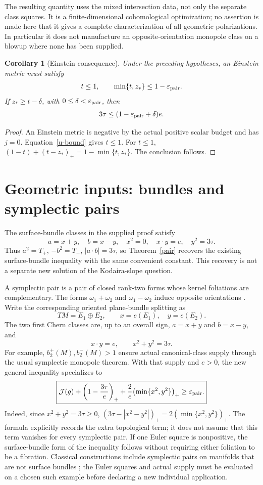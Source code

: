 \documentclass[11pt,a4paper]{article}
\newtheorem{corollary}[theorem]{Corollary}
\theoremstyle{definition}\newtheorem{assumption}[theorem]{Input}
\theoremstyle{remark}\newtheorem{remark}[theorem]{Remark}
\newcommand{\cJ}{\mathcal J}
\numberwithin{equation}{section}
\begin{document}
The resulting quantity uses the mixed intersection data, not only the separate class squares. It is a finite-dimensional cohomological optimization; no assertion is made here that it gives a complete characterization of all geometric polarizations. In particular it does not manufacture an opposite-orientation monopole class on a blowup where none has been supplied.

\begin{corollary}[Einstein consequence]
Under the preceding hypotheses, an Einstein metric must satisfy
\[
 t\le1,\qquad \min\{t,z_*\}\le1-\varepsilon_{\rm pair}.
\]
If $z_*\ge t-\delta$, with $0\le\delta<\varepsilon_{\rm pair}$, then
\[
 3\tau\le(1-\varepsilon_{\rm pair}+\delta)e.
\]
\end{corollary}
\begin{proof}
An Einstein metric is negative by the actual positive scalar budget and has $j=0$. Equation~\eqref{u-bound} gives $t\le1$. For $t\le1$,
$(1-t)+(t-z_*)_+=1-\min\{t,z_*\}$. The conclusion follows.
\end{proof}

\section{Geometric inputs: bundles and symplectic pairs}
The surface-bundle classes in the supplied proof satisfy
\[
 a=x+y,\quad b=x-y,\quad x^2=0,\quad x\cdot y=e,\quad y^2=3\tau.
\]
Thus $a^2=T_+$, $-b^2=T_-$, $|a\cdot b|=3\tau$, so Theorem~\ref{pair} recovers the existing surface-bundle inequality with the same convenient constant. This recovery is not a separate new solution of the Kodaira-slope question.

A symplectic pair is a pair of closed rank-two forms whose kernel foliations are complementary. The forms $\omega_1+\omega_2$ and $\omega_1-\omega_2$ induce opposite orientations \cite{BandeK}. Write the corresponding oriented plane-bundle splitting as
\[
 TM=E_1\oplus E_2,\qquad x=e(E_1),\quad y=e(E_2).
\]
The two first Chern classes are, up to an overall sign, $a=x+y$ and $b=x-y$, and
\[
 x\cdot y=e,\qquad x^2+y^2=3\tau.
\]
For example, $b_2^+(M),b_2^-(M)>1$ ensure actual canonical-class supply through the usual symplectic monopole theorem. With that supply and $e>0$, the new general inequality specializes to
\begin{equation}\label{symp-pair}
\boxed{
 \cJ(g)+\left(1-\frac{3\tau}{e}\right)_+
 +\frac{2}{e}\bigl(\min\{x^2,y^2\}\bigr)_+
 \ge\varepsilon_{\rm pair}.
}
\end{equation}
Indeed, since $x^2+y^2=3\tau\ge0$,
$(3\tau-|x^2-y^2|)_+=2(\min\{x^2,y^2\})_+$.
The formula explicitly records the extra topological term; it does not assume that this term vanishes for every symplectic pair. If one Euler square is nonpositive, the surface-bundle form of the inequality follows without requiring either foliation to be a fibration. Classical constructions include symplectic pairs on manifolds that are not surface bundles \cite{BandeK}; the Euler squares and actual supply must be evaluated on a chosen such example before declaring a new individual application.
\end{document}
